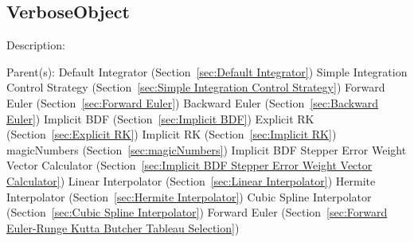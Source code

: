 \subsection{VerboseObject}
\label{sec:VerboseObject}

\begin{list}{}
  {\setlength{\leftmargin}{1.0in}
   \setlength{\labelwidth}{0.75in}
   \setlength{\labelsep}{0.125in}}
  \item[Description:]
  \item[Parent(s):]
    Default Integrator (Section~\ref{sec:Default Integrator})
      \newline 
    Simple Integration Control Strategy (Section~\ref{sec:Simple Integration Control Strategy})
      \newline 
    Forward Euler (Section~\ref{sec:Forward Euler})
      \newline 
    Backward Euler (Section~\ref{sec:Backward Euler})
      \newline 
    Implicit BDF (Section~\ref{sec:Implicit BDF})
      \newline 
    Explicit RK (Section~\ref{sec:Explicit RK})
      \newline 
    Implicit RK (Section~\ref{sec:Implicit RK})
      \newline 
    magicNumbers (Section~\ref{sec:magicNumbers})
      \newline 
    Implicit BDF Stepper Error Weight Vector Calculator (Section~\ref{sec:Implicit BDF Stepper Error Weight Vector Calculator})
      \newline 
    Linear Interpolator (Section~\ref{sec:Linear Interpolator})
      \newline 
    Hermite Interpolator (Section~\ref{sec:Hermite Interpolator})
      \newline 
    Cubic Spline Interpolator (Section~\ref{sec:Cubic Spline Interpolator})
      \newline 
    Forward Euler (Section~\ref{sec:Forward Euler-Runge Kutta Butcher Tableau Selection})

\end{list}
